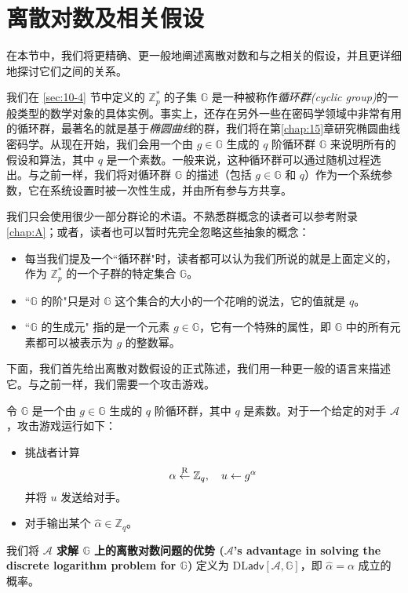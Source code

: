\section{离散对数及相关假设}\label{sec:10-5}

在本节中，我们将更精确、更一般地阐述离散对数和与之相关的假设，并且更详细地探讨它们之间的关系。

我们在 \ref{sec:10-4} 节中定义的 $\mathbb{Z}_p^*$ 的子集 $\mathbb{G}$ 是一种被称作\emph{循环群(cyclic group)}的一般类型的数学对象的具体实例。事实上，还存在另外一些在密码学领域中非常有用的循环群，最著名的就是基于\emph{椭圆曲线}的群，我们将在第\ref{chap:15}章研究椭圆曲线密码学。从现在开始，我们会用一个由 $g\in\mathbb{G}$ 生成的 $q$ 阶循环群 $\mathbb{G}$ 来说明所有的假设和算法，其中 $q$ 是一个素数。一般来说，这种循环群可以通过随机过程选出。与之前一样，我们将对循环群 $\mathbb{G}$ 的描述（包括 $g\in\mathbb{G}$ 和 $q$）作为一个系统参数，它在系统设置时被一次性生成，并由所有参与方共享。

我们只会使用很少一部分群论的术语。不熟悉群概念的读者可以参考附录 \ref{chap:A}；或者，读者也可以暂时先完全忽略这些抽象的概念：
\begin{itemize}
	\item 每当我们提及一个``循环群"时，读者都可以认为我们所说的就是上面定义的，作为 $\mathbb{Z}_p^*$ 的一个子群的特定集合 $\mathbb{G}$。
	\item ``$\mathbb{G}$ 的阶"只是对 $\mathbb{G}$ 这个集合的大小的一个花哨的说法，它的值就是 $q$。
	\item ``$\mathbb{G}$ 的生成元" 指的是一个元素 $g\in\mathbb{G}$，它有一个特殊的属性，即 $\mathbb{G}$ 中的所有元素都可以被表示为 $g$ 的整数幂。
\end{itemize}

下面，我们首先给出离散对数假设的正式陈述，我们用一种更一般的语言来描述它。与之前一样，我们需要一个攻击游戏。

\begin{game}[离散对数]\label{game:10-4}
令 $\mathbb{G}$ 是一个由 $g\in\mathbb{G}$ 生成的 $q$ 阶循环群，其中 $q$ 是素数。对于一个给定的对手 $\mathcal{A}$，攻击游戏运行如下：
\begin{itemize}
	\item 挑战者计算
	\[
	\alpha\overset{\rm R}\leftarrow\mathbb{Z}_q,
	\quad
	u\leftarrow g^\alpha
	\]
	并将 $u$ 发送给对手。
	\item 对手输出某个 $\hat{\alpha}\in\mathbb{Z}_q$。
\end{itemize}
我们将 \textbf{$\mathcal{A}$ 求解 $\mathbb{G}$ 上的离散对数问题的优势 ($\mathcal{A}$'s advantage in solving the discrete logarithm problem for $\mathbb{G}$)} 定义为 $\mathrm{DL}\mathsf{adv}[\mathcal{A},\mathbb{G}]$，即 $\hat{\alpha}=\alpha$ 成立的概率。
\end{game}

